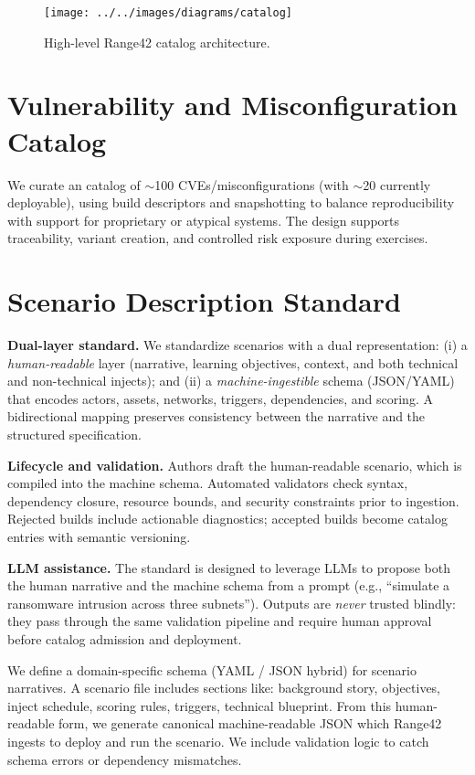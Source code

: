 \documentclass[11pt]{article}
\begin{document}
\begin{figure}[h]
\centering
\texttt{[image: ../../images/diagrams/catalog]}
\caption{High-level Range42 catalog architecture.}
\label{fig:arch_catalog}
\end{figure}

\section{Vulnerability and Misconfiguration Catalog}
We curate an catalog of $\sim$100 CVEs/misconfigurations (with $\sim$20 currently deployable), using build descriptors and snapshotting to balance reproducibility with support for proprietary or atypical systems. The design supports traceability, variant creation, and controlled risk exposure during exercises.

\section{Scenario Description Standard}

\textbf{Dual-layer standard.} We standardize scenarios with a dual representation: 
(i) a \emph{human-readable} layer (narrative, learning objectives, context, and both technical and non-technical injects); and 
(ii) a \emph{machine-ingestible} schema (JSON/YAML) that encodes actors, assets, networks, triggers, dependencies, and scoring. 
A bidirectional mapping preserves consistency between the narrative and the structured specification.

\textbf{Lifecycle and validation.} Authors draft the human-readable scenario, which is compiled into the machine schema. 
Automated validators check syntax, dependency closure, resource bounds, and security constraints prior to ingestion. 
Rejected builds include actionable diagnostics; accepted builds become catalog entries with semantic versioning.

\textbf{LLM assistance.} The standard is designed to leverage LLMs to propose both the human narrative and the machine schema from a prompt (e.g., ``simulate a ransomware intrusion across three subnets''). 
Outputs are \emph{never} trusted blindly: they pass through the same validation pipeline and require human approval before catalog admission and deployment.

We define a domain-specific schema (YAML / JSON hybrid) for scenario narratives. A scenario file includes sections like: background story, objectives, inject schedule, scoring rules, triggers, technical blueprint. From this human-readable form, we generate canonical machine-readable JSON which Range42 ingests to deploy and run the scenario. We include validation logic to catch schema errors or dependency mismatches.
\end{document}
